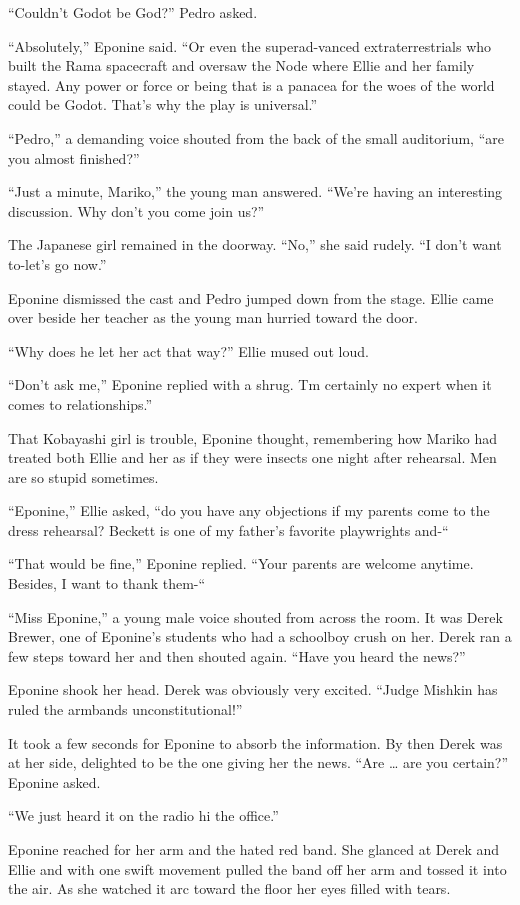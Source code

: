 \documentclass[]{article}
\begin{document}
{“Couldn’t Godot be God?” Pedro asked.

“Absolutely,” Eponine said.  “Or even the superad-vanced extraterrestrials who built the Rama spacecraft and oversaw the Node where Ellie and her family stayed.  Any power or force or being that is a panacea for the woes of the world could be Godot.  That’s why the play is universal.”

“Pedro,” a demanding voice shouted from the back of the small auditorium, “are you almost finished?”

“Just a minute, Mariko,” the young man answered.  “We’re having an interesting discussion.  Why don’t you come join us?”

The Japanese girl remained in the doorway.  “No,” she said rudely.  “I don’t want to-let’s go now.”

Eponine dismissed the cast and Pedro jumped down from the stage.  Ellie came over beside her teacher as the young man hurried toward the door.

“Why does he let her act that way?” Ellie mused out loud.

“Don’t ask me,” Eponine replied with a shrug.  Tm certainly no expert when it comes to relationships.”

That Kobayashi girl is trouble, Eponine thought, remembering how Mariko had treated both Ellie and her as if they were insects one night after rehearsal.  Men are so stupid sometimes.

“Eponine,” Ellie asked, “do you have any objections if my parents come to the dress rehearsal? Beckett is one of my father’s favorite playwrights and-“

“That would be fine,” Eponine replied.  “Your parents are welcome anytime.  Besides, I want to thank them-“

“Miss Eponine,” a young male voice shouted from across the room.  It was Derek Brewer, one of Eponine’s students who had a schoolboy crush on her.  Derek ran a few steps toward her and then shouted again.  “Have you heard the news?”

Eponine shook her head.  Derek was obviously very excited.  “Judge Mishkin has ruled the armbands unconstitutional!”

It took a few seconds for Eponine to absorb the information.  By then Derek was at her side, delighted to be the one giving her the news.  “Are … are you certain?” Eponine asked.

“We just heard it on the radio hi the office.”

Eponine reached for her arm and the hated red band.  She glanced at Derek and Ellie and with one swift movement pulled the band off her arm and tossed it into the air.  As she watched it arc toward the floor her eyes filled with tears.

}
\end{document}
